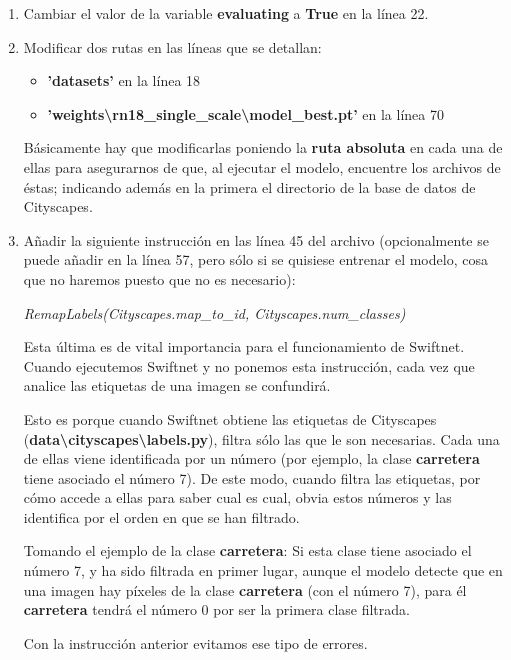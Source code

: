 \begin{enumerate}
\item Cambiar el valor de la variable \textbf{evaluating} a \textbf{True} en la línea 22.
\item Modificar dos rutas en las líneas que se detallan:
\begin{itemize}
\item \textbf{'datasets'} en la línea 18
\item \textbf{'weights\textbackslash{rn18\_single\_scale}\textbackslash{model\_best.pt}'} en la línea 70
\end{itemize}

Básicamente hay que modificarlas poniendo la \textbf{ruta absoluta} en cada una de ellas para asegurarnos de que, al ejecutar el modelo, encuentre los archivos de éstas; indicando además en la primera el directorio de la base de datos de Cityscapes.

\item Añadir la siguiente instrucción en las línea 45 del archivo (opcionalmente se puede añadir en la línea 57, pero sólo si se quisiese entrenar el modelo, cosa que no haremos puesto que no es necesario):

\begin{center}
\textit{RemapLabels(Cityscapes.map\_to\_id, Cityscapes.num\_classes)}
\end{center}

Esta última es de vital importancia para el funcionamiento de Swiftnet. Cuando ejecutemos Swiftnet y no ponemos esta instrucción, cada vez que analice las etiquetas de una imagen se confundirá.

Esto es porque cuando Swiftnet obtiene las etiquetas de Cityscapes (\textbf{data\textbackslash{cityscapes}\textbackslash{labels.py}}), filtra sólo las que le son necesarias. Cada una de ellas viene identificada por un número (por ejemplo, la clase \textbf{carretera} tiene asociado el número 7). De este modo, cuando filtra las etiquetas, por cómo accede a ellas para saber cual es cual, obvia estos números y las identifica por el orden en que se han filtrado.

Tomando el ejemplo de la clase \textbf{carretera}: Si esta clase tiene asociado el número 7, y ha sido filtrada en primer lugar, aunque el modelo detecte que en una imagen hay píxeles de la clase \textbf{carretera} (con el número 7), para él \textbf{carretera} tendrá el número 0 por ser la primera clase filtrada.

Con la instrucción anterior evitamos ese tipo de errores.
\end{enumerate}

